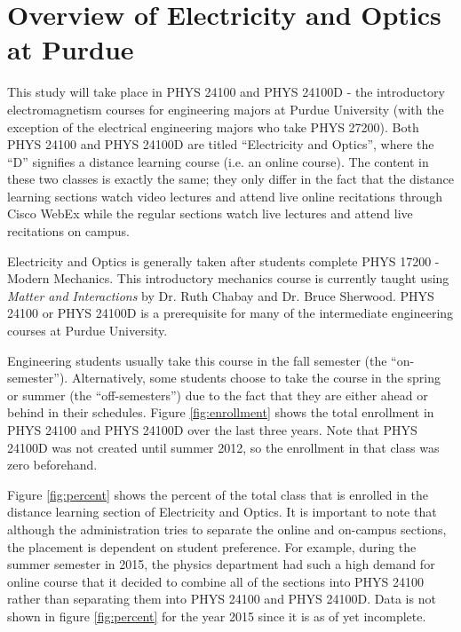\section{Overview of Electricity and Optics at Purdue}

This study will take place in PHYS 24100 and PHYS 24100D - the introductory electromagnetism courses for engineering majors at Purdue University (with the exception of the electrical engineering majors who take PHYS 27200). Both PHYS 24100 and PHYS 24100D are titled ``Electricity and Optics'', where the ``D'' signifies a distance learning course (i.e. an online course). The content in these two classes is exactly the same; they only differ in the fact that the distance learning sections watch video lectures and attend live online recitations through Cisco WebEx while the regular sections watch live lectures and attend live recitations on campus.

Electricity and Optics is generally taken after students complete PHYS 17200 - Modern Mechanics. This introductory mechanics course is currently taught using \textit{Matter and Interactions} by Dr. Ruth Chabay and Dr. Bruce Sherwood\cite{chabay2010}. PHYS 24100 or PHYS 24100D is a prerequisite for many of the intermediate engineering courses at Purdue University.

Engineering students usually take this course in the fall semester (the ``on-semester''). Alternatively, some students choose to take the course in the spring or summer (the ``off-semesters'') due to the fact that they are either ahead or behind in their schedules. Figure \ref{fig:enrollment} shows the total enrollment in PHYS 24100 and PHYS 24100D over the last three years. Note that PHYS 24100D was not created until summer 2012, so the enrollment in that class was zero beforehand.

Figure \ref{fig:percent} shows the percent of the total class that is enrolled in the distance learning section of Electricity and Optics. It is important to note that although the administration tries to separate the online and on-campus sections, the placement is dependent on student preference. For example, during the summer semester in 2015, the physics department had such a high demand for online course that it decided to combine all of the sections into PHYS 24100 rather than separating them into PHYS 24100 and PHYS 24100D. Data is not shown in figure \ref{fig:percent} for the year 2015 since it is as of yet incomplete.

